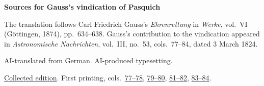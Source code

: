 \clearpage\thispagestyle{empty}
\begin{center}\Large\bfseries Sources for Gauss’s vindication of Pasquich\end{center}

The translation follows Carl Friedrich Gauss’s \emph{Ehrenrettung} in \emph{Werke}, vol.~VI (Göttingen, 1874), pp.~634--638. Gauss’s contribution to the vindication appeared in \emph{Astronomische Nachrichten}, vol.~III, no.~53, cols.~77--84, dated 3 March 1824.

AI-translated from German. AI-produced typesetting.

\href{https://gdz.sub.uni-goettingen.de/id/PPN236007467}{Collected edition}. First printing, cols.~\href{https://api.digitale-sammlungen.de/iiif/image/v2/bsb10049428_00051/full/1600,/0/default.jpg}{77--78}, \href{https://api.digitale-sammlungen.de/iiif/image/v2/bsb10049428_00052/full/1600,/0/default.jpg}{79--80}, \href{https://api.digitale-sammlungen.de/iiif/image/v2/bsb10049428_00053/full/1600,/0/default.jpg}{81--82}, \href{https://api.digitale-sammlungen.de/iiif/image/v2/bsb10049428_00054/full/1600,/0/default.jpg}{83--84}.

\clearpage
